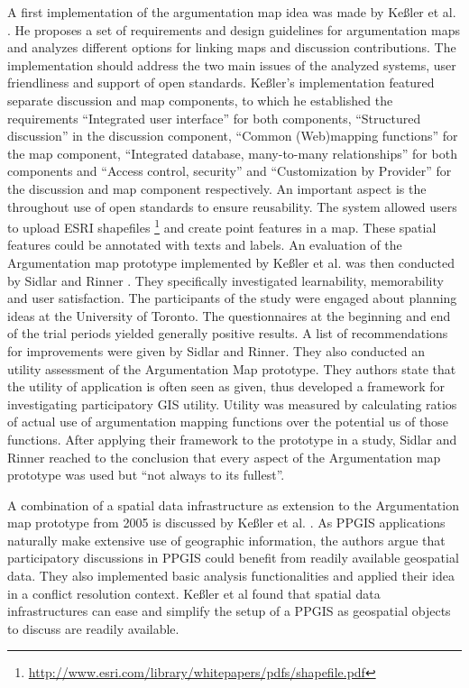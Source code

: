 A first implementation of the argumentation map idea was made by Ke{\ss}ler et al. \cite{Kessler2005_ArgumentationMapPrototype}. He proposes a set of requirements and design guidelines for argumentation maps and analyzes different options for linking maps and discussion contributions. The implementation should address the two main issues of the analyzed systems, user friendliness and support of open standards. Ke{\ss}ler's implementation featured separate discussion and map components, to which he established the requirements ``Integrated user interface'' for both components, ``Structured discussion'' in the discussion component, ``Common (Web)mapping functions'' for the map component, ``Integrated database, many-to-many relationships'' for both components and ``Access control, security'' and ``Customization by Provider'' for the discussion and map component respectively. An important aspect is the throughout use of open standards to ensure reusability. The system allowed users to upload ESRI shapefiles \footnote{\url{http://www.esri.com/library/whitepapers/pdfs/shapefile.pdf}} and create point features in a map. These spatial features could be annotated with texts and labels. An evaluation of the Argumentation map prototype implemented by Ke{\ss}ler et al. was then conducted by Sidlar and Rinner \cite{sidlar_argumap_2007}. They specifically investigated learnability, memorability and user satisfaction. The participants of the study were engaged about planning ideas at the University of Toronto. The questionnaires at the beginning and end of the trial periods yielded generally positive results. A list of recommendations for improvements were given by Sidlar and Rinner. They also conducted an utility assessment \cite{Sidlar2009 AssessmentMapGeocollaborationTool} of the Argumentation Map prototype. They authors state that the utility of application is often seen as given, thus developed a framework for investigating participatory GIS utility. Utility was measured by calculating ratios of actual use of argumentation mapping functions over the potential us of those functions. After applying their framework to the prototype in a study, Sidlar and Rinner reached to the conclusion that every aspect of the Argumentation map prototype was used but ``not always to its fullest''.

A combination of a spatial data infrastructure as extension to the Argumentation map prototype from 2005 is discussed by Ke{\ss}ler et al. \cite{Kessler2005_Conflict_Resolution}. As PPGIS applications naturally make extensive use of geographic information, the authors argue that participatory discussions in PPGIS could benefit from readily available geospatial data. They also implemented basic analysis functionalities and applied their idea in a conflict resolution context. Ke{\ss}ler et al found that spatial data infrastructures can ease and simplify the setup of a PPGIS as geospatial objects to discuss are readily available.

